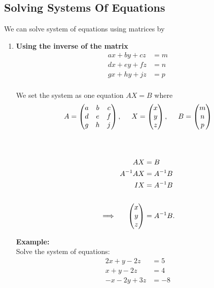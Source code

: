 \documentclass[11pt,a4paper]{article}
\begin{document}
\subsection{Solving Systems Of Equations}
We can solve system of equations using matrices by 
\begin{enumerate}
\item[(a).]\textbf{Using the inverse of the matrix}
\begin{align*}
ax +by + cz & = m\\
dx + ey + fz & = n\\
gx + hy + jz & =p\\
\end{align*}


We set the system as one equation $AX=B$ where $$A=
\begin{pmatrix}
a & b & c\\
d & e & f\\
g & h & j\\
\end{pmatrix}
,\hspace{0.5cm} X=
\begin{pmatrix}
x\\ y\\ z\\
\end{pmatrix}
,\hspace{0.5cm}
B=
\begin{pmatrix}
m\\n\\p\\
\end{pmatrix}
$$\\\\


\begin{align*}
AX &=B\\
A^{-1}AX &=A^{-1}B\\
IX & = A^{-1}B\\\\
\implies \hspace{0.5cm} 
\begin{pmatrix}
x\\ y\\ z\\
\end{pmatrix}
 & = A^{-1}B.\\
\end{align*}

\textbf{Example:}\\ Solve the system of equations:
\begin{align*}
2x+y-2z & =5\\
x + y -2z & =4\\
-x-2y+3z & = -8\\
\end{align*}



\end{enumerate}
\end{document}
